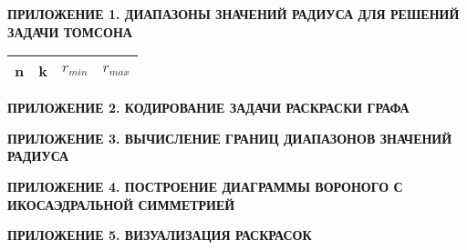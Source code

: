 


\lstset{style=mystyle}


\newpage
\begin{center}
\noindent\textbf{ПРИЛОЖЕНИЕ 1. ДИАПАЗОНЫ ЗНАЧЕНИЙ РАДИУСА ДЛЯ РЕШЕНИЙ ЗАДАЧИ ТОМСОНА}\label{attachments:1}
\vspace{1.5mm}
\end{center}

\begin{longtable}{ccll} 
\hline
n & k & $r_{min}$ & $r_{max}$ \\ 
\hline
\endhead

\hline
\end{longtable}

\newpage
\begin{center}
\noindent\textbf{ПРИЛОЖЕНИЕ 2. КОДИРОВАНИЕ ЗАДАЧИ РАСКРАСКИ ГРАФА}\label{attachments:2}
\vspace{1.5mm}
\end{center}



\newpage
\begin{center}
\noindent\textbf{ПРИЛОЖЕНИЕ 3. ВЫЧИСЛЕНИЕ ГРАНИЦ ДИАПАЗОНОВ ЗНАЧЕНИЙ РАДИУСА}\label{attachments:3}
\vspace{1.5mm}
\end{center}



\newpage
\begin{center}
\noindent\textbf{ПРИЛОЖЕНИЕ 4. ПОСТРОЕНИЕ ДИАГРАММЫ ВОРОНОГО С ИКОСАЭДРАЛЬНОЙ СИММЕТРИЕЙ}\label{attachments:4}
\vspace{1.5mm}
\end{center}



\newpage
\begin{center}
\noindent\textbf{ПРИЛОЖЕНИЕ 5. ВИЗУАЛИЗАЦИЯ РАСКРАСОК}\label{attachments:5}
\vspace{1.5mm}
\end{center}




